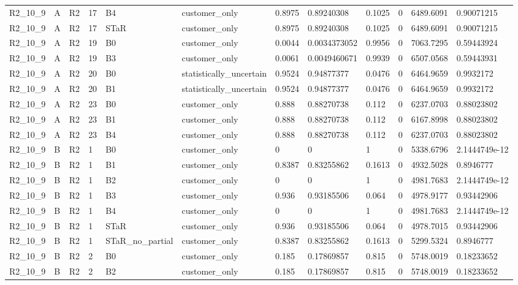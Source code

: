 \begin{longtable}{llllllllllll}
R2\_10\_9 & A & R2 & 17 & B4 & customer\_only & 0.8975 & 0.89240308 & 0.1025 & 0 & 6489.6091 & 0.90071215 \\
R2\_10\_9 & A & R2 & 17 & STaR & customer\_only & 0.8975 & 0.89240308 & 0.1025 & 0 & 6489.6091 & 0.90071215 \\
R2\_10\_9 & A & R2 & 19 & B0 & customer\_only & 0.0044 & 0.0034373052 & 0.9956 & 0 & 7063.7295 & 0.59443924 \\
R2\_10\_9 & A & R2 & 19 & B3 & customer\_only & 0.0061 & 0.0049460671 & 0.9939 & 0 & 6507.0568 & 0.59443931 \\
R2\_10\_9 & A & R2 & 20 & B0 & statistically\_uncertain & 0.9524 & 0.94877377 & 0.0476 & 0 & 6464.9659 & 0.9932172 \\
R2\_10\_9 & A & R2 & 20 & B1 & statistically\_uncertain & 0.9524 & 0.94877377 & 0.0476 & 0 & 6464.9659 & 0.9932172 \\
R2\_10\_9 & A & R2 & 23 & B0 & customer\_only & 0.888 & 0.88270738 & 0.112 & 0 & 6237.0703 & 0.88023802 \\
R2\_10\_9 & A & R2 & 23 & B1 & customer\_only & 0.888 & 0.88270738 & 0.112 & 0 & 6167.8998 & 0.88023802 \\
R2\_10\_9 & A & R2 & 23 & B4 & customer\_only & 0.888 & 0.88270738 & 0.112 & 0 & 6237.0703 & 0.88023802 \\
R2\_10\_9 & B & R2 & 1 & B0 & customer\_only & 0 & 0 & 1 & 0 & 5338.6796 & 2.1444749e-12 \\
R2\_10\_9 & B & R2 & 1 & B1 & customer\_only & 0.8387 & 0.83255862 & 0.1613 & 0 & 4932.5028 & 0.8946777 \\
R2\_10\_9 & B & R2 & 1 & B2 & customer\_only & 0 & 0 & 1 & 0 & 4981.7683 & 2.1444749e-12 \\
R2\_10\_9 & B & R2 & 1 & B3 & customer\_only & 0.936 & 0.93185506 & 0.064 & 0 & 4978.9177 & 0.93442906 \\
R2\_10\_9 & B & R2 & 1 & B4 & customer\_only & 0 & 0 & 1 & 0 & 4981.7683 & 2.1444749e-12 \\
R2\_10\_9 & B & R2 & 1 & STaR & customer\_only & 0.936 & 0.93185506 & 0.064 & 0 & 4978.7015 & 0.93442906 \\
R2\_10\_9 & B & R2 & 1 & STaR\_no\_partial & customer\_only & 0.8387 & 0.83255862 & 0.1613 & 0 & 5299.5324 & 0.8946777 \\
R2\_10\_9 & B & R2 & 2 & B0 & customer\_only & 0.185 & 0.17869857 & 0.815 & 0 & 5748.0019 & 0.18233652 \\
R2\_10\_9 & B & R2 & 2 & B2 & customer\_only & 0.185 & 0.17869857 & 0.815 & 0 & 5748.0019 & 0.18233652 \\

\end{longtable}
